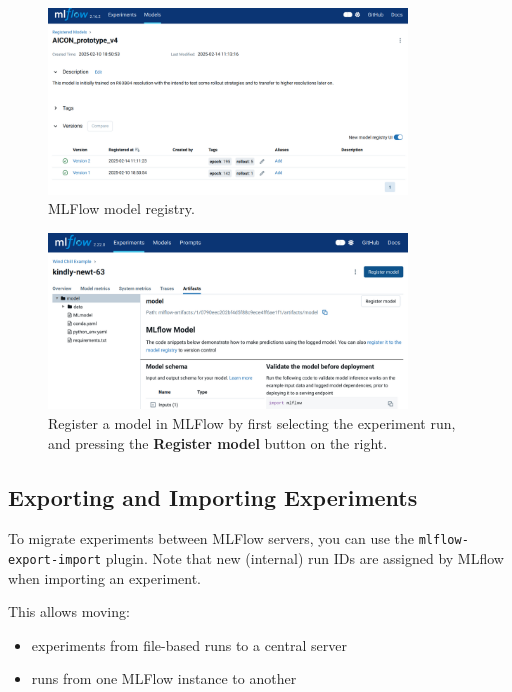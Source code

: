 \begin{figure}[htbp]
    \centering
    \includegraphics[width=0.85\textwidth]{images/mlflow_registry.png}
    \caption{MLFlow model registry.}
    \label{fig:mlflow_registry}
\end{figure}

\begin{figure}[htbp]
    \centering
    \includegraphics[width=0.85\textwidth]{images/mlflow_register.png}
    \caption{Register a model in MLFlow by first selecting the experiment run, and pressing the \textbf{Register model} button on the right.}
    \label{fig:mlflow_register}
\end{figure}

%
\subsection{Exporting and Importing Experiments}

To migrate experiments between MLFlow servers, you can use the \texttt{mlflow-export-import} plugin. Note that new (internal) run IDs are assigned by MLflow when importing an experiment.

This allows moving:
\begin{itemize}
    \item experiments from file-based runs to a central server
    \item runs from one MLFlow instance to another
\end{itemize}

